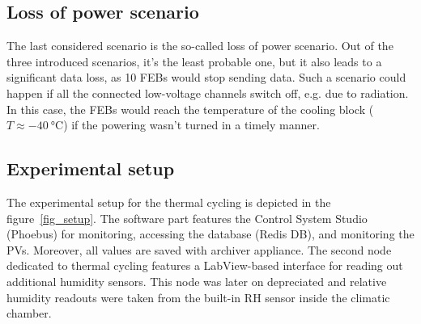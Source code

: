 \newpage
\subsection{Loss of power scenario}
\label{power_loss}
The last considered scenario is the so-called loss of power scenario. Out of the three introduced scenarios, it's the least probable one, but it also leads to a significant data loss, as 10 \glspl{FEB} would stop sending data. Such a scenario could happen if all the connected low-voltage channels switch off, e.g. due to radiation. In this case, the \glspl{FEB} would reach the temperature of the cooling block ($T \approx \SI{-40}{\celsius}$) if the powering wasn't turned in a timely manner.


\subsection{Experimental setup}
\label{cycling_setup}
The experimental setup for the thermal cycling is depicted in the figure~\ref{fig_setup}. The software part features the Control System Studio (Phoebus) for monitoring, accessing the database (Redis DB), and monitoring the \gls{PV}s. Moreover, all values are saved with archiver appliance. The second node dedicated to thermal cycling features a LabView-based interface for reading out additional humidity sensors. This node was later on depreciated and relative humidity readouts were taken from the built-in \gls{RH} sensor inside the climatic chamber.


